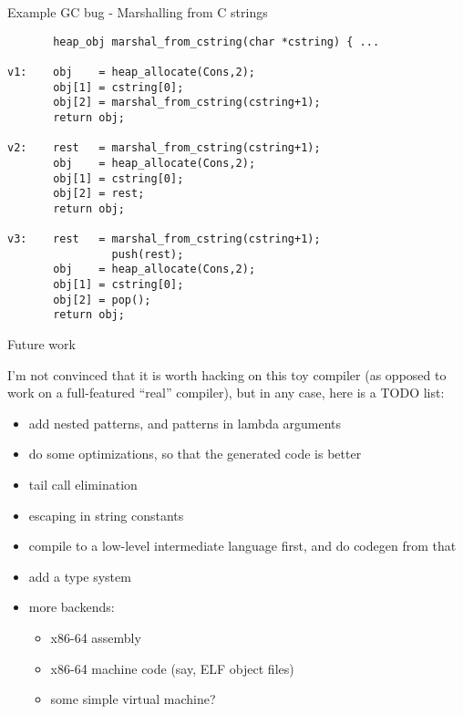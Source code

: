 \documentclass{beamer}
\begin{document}

\begin{frame}[fragile]{Example GC bug - Marshalling from C strings}

{\footnotesize
\begin{verbatim}
       heap_obj marshal_from_cstring(char *cstring) { ...
       
v1:    obj    = heap_allocate(Cons,2);
       obj[1] = cstring[0];
       obj[2] = marshal_from_cstring(cstring+1);
       return obj;
       
v2:    rest   = marshal_from_cstring(cstring+1);
       obj    = heap_allocate(Cons,2);
       obj[1] = cstring[0];
       obj[2] = rest;
       return obj;
       
v3:    rest   = marshal_from_cstring(cstring+1);
                push(rest);
       obj    = heap_allocate(Cons,2);
       obj[1] = cstring[0];
       obj[2] = pop();
       return obj;
\end{verbatim}
}

\end{frame}


\begin{frame}{Future work}

I'm not convinced that it is worth hacking on this toy compiler (as opposed to work
on a full-featured ``real'' compiler), but in any case, here is a TODO list:\\[10pt]

\begin{itemize}
\item add nested patterns, and patterns in lambda arguments
\item do some optimizations, so that the generated code is better
\item tail call elimination
\item escaping in string constants
\item compile to a low-level intermediate language first, and do codegen from that
\item add a type system
\item more backends:
  \begin{itemize}
  \item x86-64 assembly
  \item x86-64 machine code (say, ELF object files)
  \item some simple virtual machine?
  \end{itemize}
\end{itemize}

\end{frame}


\end{document}
